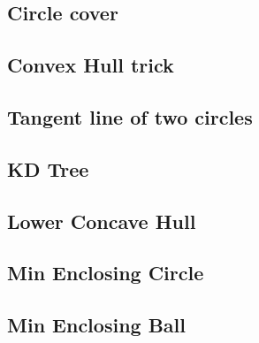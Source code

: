 \documentclass[a4paper,10pt,twocolumn,oneside]{article}
\begin{document}
\subsection{Circle cover}


%

\subsection{Convex Hull trick}


\subsection{Tangent line of two circles}


\subsection{KD Tree}
%


%

\subsection{Lower Concave Hull}


% 

\subsection{Min Enclosing Circle}


\subsection{Min Enclosing Ball}

\end{document}
